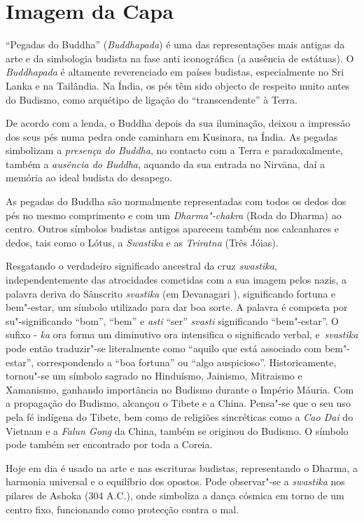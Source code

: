 \chapter{Imagem da Capa}

``Pegadas do Buddha'' (\emph{Buddhapada}) é uma das representações mais antigas
da arte e da simbologia budista na fase anti iconográfica (a ausência de
estátuas). O \emph{Buddhapada} é altamente reverenciado em países budistas,
especialmente no Sri Lanka e na Tailândia. Na Índia, os pés têm sido objecto de
respeito muito antes do Budismo, como arquétipo de ligação do ``transcendente''
à Terra.

De acordo com a lenda, o Buddha depois da sua iluminação, deixou a impressão dos
seus pés numa pedra onde caminhara em Kusinara, na Índia. As pegadas simbolizam
a \emph{presença do Buddha}, no contacto com a Terra e paradoxalmente, também a
\emph{ausência do Buddha}, aquando da sua entrada no Nirvāna, daí a memória ao
ideal budista do desapego.

As pegadas do Buddha são normalmente representadas com todos os dedos dos pés no
mesmo comprimento e com um \emph{Dharma"-chakra} (Roda do Dharma) ao
centro. Outros símbolos budistas antigos aparecem também nos calcanhares e
dedos, tais como o Lótus, a \emph{Swastika} e as \emph{Triratna} (Três Jóias).

Resgatando o verdadeiro significado ancestral da cruz \emph{swastika},
independentemente das atrocidades cometidas com a sua imagem pelos nazis, a
palavra deriva do Sânscrito \emph{svastika} (em Devanagari ),
significando fortuna e bem"-estar, um símbolo utilizado para dar boa sorte. A
palavra é composta por su"-significando ``bom'', ``bem'' e \emph{asti} ``ser''
\emph{svasti} significando ``bem"-estar''. O sufixo - \emph{ka} ora forma um
diminutivo ora intensifica o significado verbal, e~\emph{svastika} pode então
traduzir"-se literalmente como ``aquilo que está associado com bem"-estar'',
correspondendo a ``boa fortuna'' ou ``algo auspicioso''. Historicamente,
tornou"-se um símbolo sagrado no Hinduísmo, Jainismo, Mitraismo e Xamanismo,
ganhando importância no Budismo durante o Império Máuria. Com a propagação do
Budismo, alcançou o Tibete e a China. Pensa"-se que o seu uso pela fé indígena do
Tibete, bem como de religiões sincréticas como a \emph{Cao Dai} do Vietnam e a
\emph{Falun Gong} da China, também se originou do Budismo. O símbolo pode também
ser encontrado por toda a Coreia.

Hoje em dia é usado na arte e nas escrituras budistas, representando o Dharma,
a harmonia universal e o equilíbrio dos opostos. Pode observar"-se
a \emph{swastika} nos pilares de Ashoka (304 A.C.), onde simboliza a dança
cósmica em torno de um centro fixo, funcionando como protecção contra o mal.
